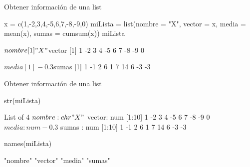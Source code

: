 \documentclass[
  ignorenonframetext,
  aspectratio=169]{beamer}
\newenvironment{Shaded}{\begin{snugshade}}{\end{snugshade}}
\newcommand{\AttributeTok}[1]{\textcolor[rgb]{0.77,0.63,0.00}{#1}}
\newcommand{\DecValTok}[1]{\textcolor[rgb]{0.00,0.00,0.81}{#1}}
\newcommand{\FunctionTok}[1]{\textcolor[rgb]{0.00,0.00,0.00}{#1}}
\newcommand{\NormalTok}[1]{#1}
\newcommand{\OtherTok}[1]{\textcolor[rgb]{0.56,0.35,0.01}{#1}}
\newcommand{\SpecialCharTok}[1]{\textcolor[rgb]{0.00,0.00,0.00}{#1}}
\newcommand{\StringTok}[1]{\textcolor[rgb]{0.31,0.60,0.02}{#1}}
\let\oldverbatim\verbatim
\let\endoldverbatim\endverbatim
\renewenvironment{verbatim}{\tiny\oldverbatim}{\endoldverbatim}
\begin{document}
\begin{frame}[fragile]{Obtener información de una list}
\protect\hypertarget{obtener-informaciuxf3n-de-una-list-1}{}
\begin{Shaded}
\begin{Highlighting}[]
\NormalTok{x }\OtherTok{=} \FunctionTok{c}\NormalTok{(}\DecValTok{1}\NormalTok{,}\SpecialCharTok{{-}}\DecValTok{2}\NormalTok{,}\DecValTok{3}\NormalTok{,}\DecValTok{4}\NormalTok{,}\SpecialCharTok{{-}}\DecValTok{5}\NormalTok{,}\DecValTok{6}\NormalTok{,}\DecValTok{7}\NormalTok{,}\SpecialCharTok{{-}}\DecValTok{8}\NormalTok{,}\SpecialCharTok{{-}}\DecValTok{9}\NormalTok{,}\DecValTok{0}\NormalTok{)}
\NormalTok{miLista }\OtherTok{=} \FunctionTok{list}\NormalTok{(}\AttributeTok{nombre =} \StringTok{"X"}\NormalTok{, }\AttributeTok{vector =}\NormalTok{ x, }\AttributeTok{media =} \FunctionTok{mean}\NormalTok{(x), }
               \AttributeTok{sumas =} \FunctionTok{cumsum}\NormalTok{(x))}
\NormalTok{miLista}
\end{Highlighting}
\end{Shaded}

\begin{verbatim}
$nombre
[1] "X"

$vector
 [1]  1 -2  3  4 -5  6  7 -8 -9  0

$media
[1] -0.3

$sumas
 [1]  1 -1  2  6  1  7 14  6 -3 -3
\end{verbatim}
\end{frame}

\begin{frame}[fragile]{Obtener información de una list}
\protect\hypertarget{obtener-informaciuxf3n-de-una-list-2}{}
\begin{Shaded}
\begin{Highlighting}[]
\FunctionTok{str}\NormalTok{(miLista)}
\end{Highlighting}
\end{Shaded}

\begin{verbatim}
List of 4
 $ nombre: chr "X"
 $ vector: num [1:10] 1 -2 3 4 -5 6 7 -8 -9 0
 $ media : num -0.3
 $ sumas : num [1:10] 1 -1 2 6 1 7 14 6 -3 -3
\end{verbatim}

\begin{Shaded}
\begin{Highlighting}[]
\FunctionTok{names}\NormalTok{(miLista)}
\end{Highlighting}
\end{Shaded}

\begin{verbatim}
[1] "nombre" "vector" "media"  "sumas" 
\end{verbatim}
\end{frame}
\end{document}

